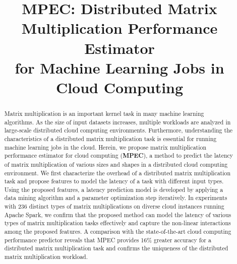 \documentclass[10pt, conference, compsocconf]{IEEEtran}
\begin{document}

\title{MPEC: Distributed Matrix Multiplication Performance Estimator \\for Machine Learning Jobs in Cloud Computing}

\author{
\and
{}
}

\maketitle

\begin{abstract}
  Matrix multiplication is an important kernel task in many machine learning algorithms. As the size of input datasets increases, multiple workloads are analyzed in large-scale distributed cloud computing environments. Furthermore, understanding the characteristics of a distributed matrix multiplication task is essential for running machine learning jobs in the cloud. Herein, we propose matrix multiplication performance estimator for cloud computing (\textbf{MPEC}), a method to predict the latency of matrix multiplication of various sizes and shapes in a distributed cloud computing environment. We first characterize the overhead of a distributed matrix multiplication task and propose features to model the latency of a task with different input types. Using the proposed features, a latency prediction model is developed by applying a data mining algorithm and a parameter optimization step iteratively. In experiments with 236 distinct types of matrix multiplications on diverse cloud instances running Apache Spark, we confirm that the proposed method can model the latency of various types of matrix multiplication tasks effectively and capture the non-linear interactions among the proposed features. A comparison with the state-of-the-art cloud computing performance predictor reveals that MPEC provides 16\% greater accuracy for a distributed matrix multiplication task and confirms the uniqueness of the distributed matrix multiplication workload.
\end{abstract}
\end{document}

